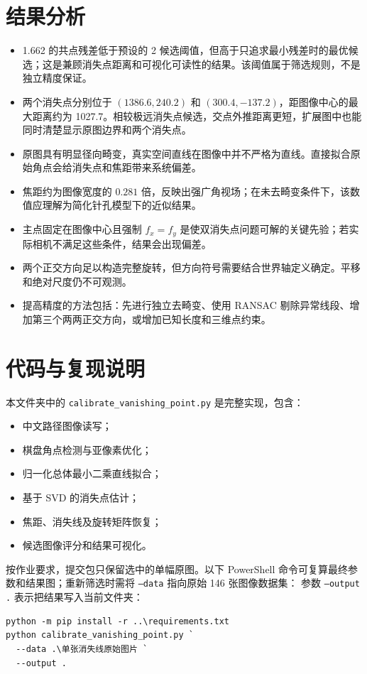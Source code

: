 \documentclass[UTF8,a4paper,12pt]{ctexart}
\begin{document}
\section{结果分析}

\begin{itemize}
  \item \SI{1.662}{\pixel} 的共点残差低于预设的 \SI{2}{\pixel} 候选阈值，但高于只追求最小残差时的最优候选；这是兼顾消失点距离和可视化可读性的结果。该阈值属于筛选规则，不是独立精度保证。
  \item 两个消失点分别位于 $(1386.6,240.2)$ 和 $(300.4,-137.2)$，距图像中心的最大距离约为 \SI{1027.7}{\pixel}。相较极远消失点候选，交点外推距离更短，扩展图中也能同时清楚显示原图边界和两个消失点。
  \item 原图具有明显径向畸变，真实空间直线在图像中并不严格为直线。直接拟合原始角点会给消失点和焦距带来系统偏差。
  \item 焦距约为图像宽度的 $0.281$ 倍，反映出强广角视场；在未去畸变条件下，该数值应理解为简化针孔模型下的近似结果。
  \item 主点固定在图像中心且强制 $f_x=f_y$ 是使双消失点问题可解的关键先验；若实际相机不满足这些条件，结果会出现偏差。
  \item 两个正交方向足以构造完整旋转，但方向符号需要结合世界轴定义确定。平移和绝对尺度仍不可观测。
  \item 提高精度的方法包括：先进行独立去畸变、使用 RANSAC 剔除异常线段、增加第三个两两正交方向，或增加已知长度和三维点约束。
\end{itemize}

\section{代码与复现说明}

本文件夹中的 \texttt{calibrate\_vanishing\_point.py} 是完整实现，包含：
\begin{itemize}
  \item 中文路径图像读写；
  \item 棋盘角点检测与亚像素优化；
  \item 归一化总体最小二乘直线拟合；
  \item 基于 SVD 的消失点估计；
  \item 焦距、消失线及旋转矩阵恢复；
  \item 候选图像评分和结果可视化。
\end{itemize}

按作业要求，提交包只保留选中的单幅原图。以下 PowerShell 命令可复算最终参数和结果图；重新筛选时需将 \texttt{--data} 指向原始 146 张图像数据集：
参数 \texttt{--output .} 表示把结果写入当前文件夹：
\begin{verbatim}
python -m pip install -r ..\requirements.txt
python calibrate_vanishing_point.py `
  --data .\单张消失线原始图片 `
  --output .
\end{verbatim}
\end{document}
